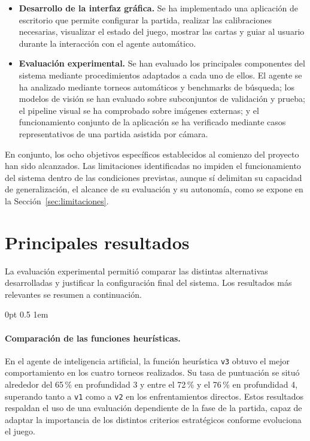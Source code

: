 \begin{itemize}
    \item \textbf{Desarrollo de la interfaz gráfica.} Se ha implementado una aplicación de escritorio que permite configurar la partida, realizar las calibraciones necesarias, visualizar el estado del juego, mostrar las cartas y guiar al usuario durante la interacción con el agente automático.

    \item \textbf{Evaluación experimental.} Se han evaluado los principales componentes del sistema mediante procedimientos adaptados a cada uno de ellos. El agente se ha analizado mediante torneos automáticos y benchmarks de búsqueda; los modelos de visión se han evaluado sobre subconjuntos de validación y prueba; el pipeline visual se ha comprobado sobre imágenes externas; y el funcionamiento conjunto de la aplicación se ha verificado mediante casos representativos de una partida asistida por cámara.
\end{itemize}

En conjunto, los ocho objetivos específicos establecidos al comienzo del proyecto han sido alcanzados. Las limitaciones identificadas no impiden el funcionamiento del sistema dentro de las condiciones previstas, aunque sí delimitan su capacidad de generalización, el alcance de su evaluación y su autonomía, como se expone en la Sección~\ref{sec:limitaciones}.


\section{Principales resultados}
\label{sec:principales-resultados}

La evaluación experimental permitió comparar las distintas alternativas desarrolladas y justificar la configuración final del sistema. Los resultados más relevantes se resumen a continuación.

\begingroup
\titlespacing*{\paragraph}
    {0pt}
    {0.5\baselineskip}
    {1em}

\paragraph{Comparación de las funciones heurísticas.}
En el agente de inteligencia artificial, la función heurística \texttt{v3} obtuvo el mejor comportamiento en los cuatro torneos realizados. Su tasa de puntuación se situó alrededor del 65\,\% en profundidad 3 y entre el 72\,\% y el 76\,\% en profundidad 4, superando tanto a \texttt{v1} como a \texttt{v2} en los enfrentamientos directos. Estos resultados respaldan el uso de una evaluación dependiente de la fase de la partida, capaz de adaptar la importancia de los distintos criterios estratégicos conforme evoluciona el juego.

